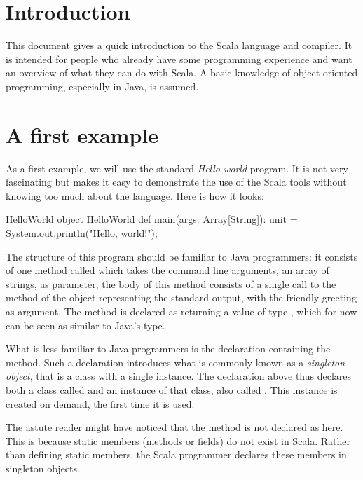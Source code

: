 \documentclass[a4paper,12pt,twoside,titlepage]{article}
\newcommand{\langname}[1]{#1\xspace}
\newcommand{\Scala}{\langname{Scala}}
\newcommand{\Java}{\langname{Java}}
\begin{document}
\makedoctitle

\section{Introduction}
\label{sec:introduction}

This document gives a quick introduction to the \Scala language and
compiler. It is intended for people who already have some programming
experience and want an overview of what they can do with \Scala. A
basic knowledge of object-oriented programming, especially in \Java,
is assumed.

\section{A first example}
\label{sec:first-example}

As a first example, we will use the standard \emph{Hello world}
program. It is not very fascinating but makes it easy to demonstrate
the use of the \Scala tools without knowing too much about the
language. Here is how it looks:
\begin{scalaprogram}{HelloWorld}
object HelloWorld {
  def main(args: Array[String]): unit = {
    System.out.println("Hello, world!");
  }
}
\end{scalaprogram}

The structure of this program should be familiar to Java programmers:
it consists of one method called  which takes the command
line arguments, an array of strings, as parameter; the body of this
method consists of a single call to the  method of the
object representing the standard output, with the friendly greeting as
argument. The  method is declared as returning a value of
type , which for now can be seen as similar to \Java's
 type.

What is less familiar to Java programmers is the 
declaration containing the  method. Such a declaration
introduces what is commonly known as a \emph{singleton object}, that
is a class with a single instance. The declaration above thus declares
both a class called  and an instance of that class,
also called . This instance is created on demand,
the first time it is used.

The astute reader might have noticed that the  method is
not declared as  here. This is because static members
(methods or fields) do not exist in \Scala. Rather than defining static
members, the \Scala programmer declares these members in singleton
objects.
\end{document}
